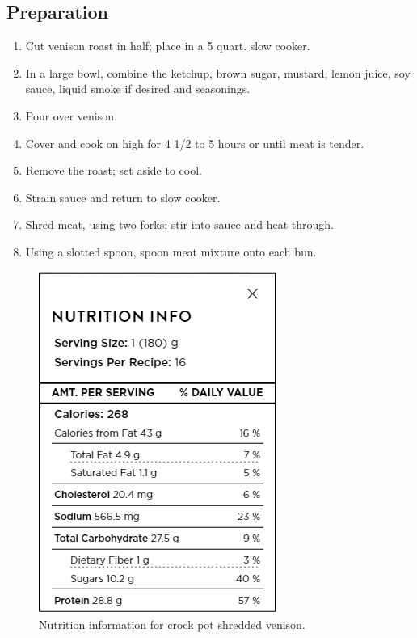 \subsection{Preparation}
\begin{enumerate}
    \item Cut venison roast in half; place in a 5 quart. slow cooker.
    \item In a large bowl, combine the ketchup, brown sugar, mustard, lemon juice, soy sauce, liquid smoke if desired and seasonings.
    \item Pour over venison.
    \item Cover and cook on high for 4 1/2 to 5 hours or until meat is tender.
    \item Remove the roast; set aside to cool.
    \item Strain sauce and return to slow cooker.
    \item Shred meat, using two forks; stir into sauce and heat through.
    \item Using a slotted spoon, spoon meat mixture onto each bun.
\end{enumerate}

\begin{figure}[h!]
    \centering
    \includegraphics[width=.25\textwidth]{img/crock-pot-shredded-venison-nutrition.png}
    \caption{Nutrition information for crock pot shredded venison.}
    \label{fig:crock-pot-shredded-venison}
\end{figure}
